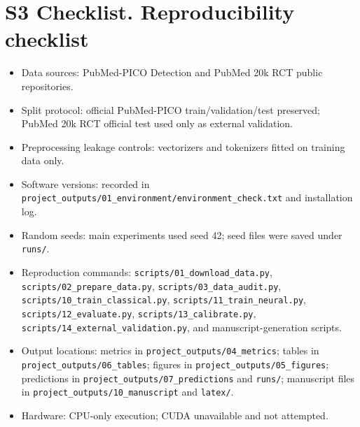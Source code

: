 \section*{S3 Checklist. Reproducibility checklist}

\begin{itemize}
\item Data sources: PubMed-PICO Detection and PubMed 20k RCT public repositories.
\item Split protocol: official PubMed-PICO train/validation/test preserved; PubMed 20k RCT official test used only as external validation.
\item Preprocessing leakage controls: vectorizers and tokenizers fitted on training data only.
\item Software versions: recorded in \texttt{project_outputs/01_environment/environment_check.txt} and installation log.
\item Random seeds: main experiments used seed 42; seed files were saved under \texttt{runs/}.
\item Reproduction commands: \texttt{scripts/01_download_data.py}, \texttt{scripts/02_prepare_data.py}, \texttt{scripts/03_data_audit.py}, \texttt{scripts/10_train_classical.py}, \texttt{scripts/11_train_neural.py}, \texttt{scripts/12_evaluate.py}, \texttt{scripts/13_calibrate.py}, \texttt{scripts/14_external_validation.py}, and manuscript-generation scripts.
\item Output locations: metrics in \texttt{project_outputs/04_metrics}; tables in \texttt{project_outputs/06_tables}; figures in \texttt{project_outputs/05_figures}; predictions in \texttt{project_outputs/07_predictions} and \texttt{runs/}; manuscript files in \texttt{project_outputs/10_manuscript} and \texttt{latex/}.
\item Hardware: CPU-only execution; CUDA unavailable and not attempted.
\end{itemize}
